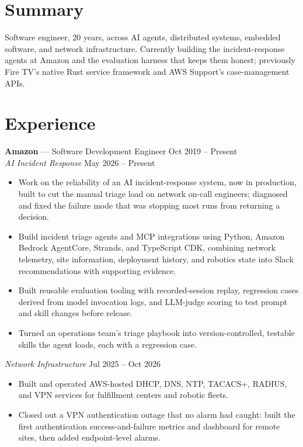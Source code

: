 \documentclass[line,margin]{res}
\begin{document}
\address{Nashville, TN \quad | \quad \href{mailto:alvarofleith@gmail.com}{alvarofleith@gmail.com} \quad | \quad \href{https://www.linkedin.com/in/alvarofleith}{linkedin.com/in/alvarofleith} \quad | \quad \href{https://github.com/fleith}{github.com/fleith}}

\begin{resume}

\section{Summary}
Software engineer, 20 years, across AI agents, distributed systems, embedded software, and network infrastructure. Currently building the incident-response agents at Amazon and the evaluation harness that keeps them honest; previously Fire TV's native Rust service framework and AWS Support's case-management APIs.

\section{Experience}

\textbf{Amazon} --- Software Development Engineer \hfill Oct 2019 -- Present \\[2pt]
{\sl AI Incident Response} \hfill May 2026 -- Present
\begin{itemize} \itemsep -3pt
\item Work on the reliability of an AI incident-response system, now in production, built to cut the manual triage load on network on-call engineers; diagnosed and fixed the failure mode that was stopping most runs from returning a decision.
\item Build incident triage agents and MCP integrations using Python, Amazon Bedrock AgentCore, Strands, and TypeScript CDK, combining network telemetry, site information, deployment history, and robotics state into Slack recommendations with supporting evidence.
\item Built reusable evaluation tooling with recorded-session replay, regression cases derived from model invocation logs, and LLM-judge scoring to test prompt and skill changes before release.
\item Turned an operations team's triage playbook into version-controlled, testable skills the agent loads, each with a regression case.
\end{itemize}

{\sl Network Infrastructure} \hfill Jul 2025 -- Oct 2026
\begin{itemize} \itemsep -3pt
\item Built and operated AWS-hosted DHCP, DNS, NTP, TACACS+, RADIUS, and VPN services for fulfillment centers and robotic fleets.
\item Closed out a VPN authentication outage that no alarm had caught: built the first authentication success-and-failure metrics and dashboard for remote sites, then added endpoint-level alarms.
\end{itemize}


\end{resume}
\end{document}
